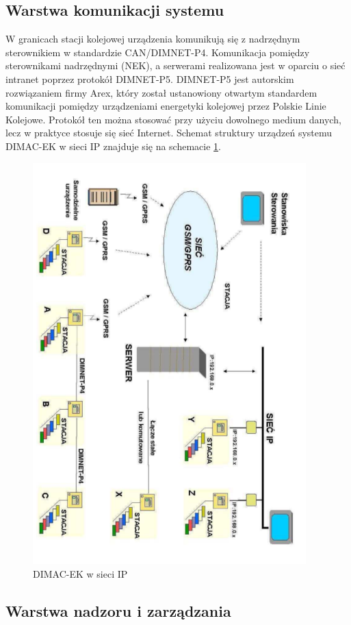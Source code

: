 \subsection{Warstwa komunikacji systemu}
W granicach stacji kolejowej urządzenia komunikują się z nadrzędnym sterownikiem w standardzie CAN/DIMNET-P4\cite{dimacek-wytyczne}.
Komunikacja pomiędzy sterownikami nadrzędnymi (NEK), a serwerami realizowana jest w oparciu o sieć intranet poprzez protokół DIMNET-P5. DIMNET-P5 jest autorskim rozwiązaniem firmy Arex, który został ustanowiony otwartym standardem komunikacji pomiędzy urządzeniami energetyki kolejowej przez Polskie Linie Kolejowe. Protokół ten można stosować przy użyciu dowolnego medium danych, lecz w praktyce stosuje się sieć Internet. Schemat struktury urządzeń systemu DIMAC-EK w sieci IP znajduje się na schemacie \ref{fig:dimacek_ip}.
\begin{figure}[t]
	\includegraphics[height=155mm]{./img/dimacek_ip.png}
	\caption{DIMAC-EK w sieci IP}
	\label{fig:dimacek_ip}
\end{figure}


\subsection{Warstwa nadzoru i zarządzania}

